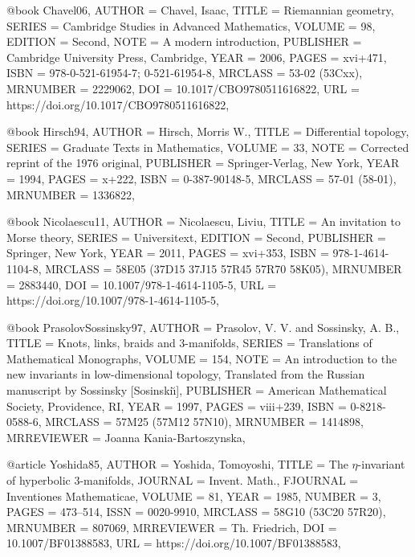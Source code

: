 @book {Chavel06,
    AUTHOR = {Chavel, Isaac},
     TITLE = {Riemannian geometry},
    SERIES = {Cambridge Studies in Advanced Mathematics},
    VOLUME = {98},
   EDITION = {Second},
      NOTE = {A modern introduction},
 PUBLISHER = {Cambridge University Press, Cambridge},
      YEAR = {2006},
     PAGES = {xvi+471},
      ISBN = {978-0-521-61954-7; 0-521-61954-8},
   MRCLASS = {53-02 (53Cxx)},
  MRNUMBER = {2229062},
       DOI = {10.1017/CBO9780511616822},
       URL = {https://doi.org/10.1017/CBO9780511616822},
}

@book {Hirsch94,
    AUTHOR = {Hirsch, Morris W.},
     TITLE = {Differential topology},
    SERIES = {Graduate Texts in Mathematics},
    VOLUME = {33},
      NOTE = {Corrected reprint of the 1976 original},
 PUBLISHER = {Springer-Verlag, New York},
      YEAR = {1994},
     PAGES = {x+222},
      ISBN = {0-387-90148-5},
   MRCLASS = {57-01 (58-01)},
  MRNUMBER = {1336822},
}

@book {Nicolaescu11,
    AUTHOR = {Nicolaescu, Liviu},
     TITLE = {An invitation to {M}orse theory},
    SERIES = {Universitext},
   EDITION = {Second},
 PUBLISHER = {Springer, New York},
      YEAR = {2011},
     PAGES = {xvi+353},
      ISBN = {978-1-4614-1104-8},
   MRCLASS = {58E05 (37D15 37J15 57R45 57R70 58K05)},
  MRNUMBER = {2883440},
       DOI = {10.1007/978-1-4614-1105-5},
       URL = {https://doi.org/10.1007/978-1-4614-1105-5},
}

@book {PrasolovSossinsky97,
    AUTHOR = {Prasolov, V. V. and Sossinsky, A. B.},
     TITLE = {Knots, links, braids and 3-manifolds},
    SERIES = {Translations of Mathematical Monographs},
    VOLUME = {154},
      NOTE = {An introduction to the new invariants in low-dimensional
              topology,
              Translated from the Russian manuscript by Sossinsky
              [Sosinski\u{\i}]},
 PUBLISHER = {American Mathematical Society, Providence, RI},
      YEAR = {1997},
     PAGES = {viii+239},
      ISBN = {0-8218-0588-6},
   MRCLASS = {57M25 (57M12 57N10)},
  MRNUMBER = {1414898},
MRREVIEWER = {Joanna Kania-Bartoszynska},
}

@article {Yoshida85,
    AUTHOR = {Yoshida, Tomoyoshi},
     TITLE = {The {$\eta$}-invariant of hyperbolic {$3$}-manifolds},
   JOURNAL = {Invent. Math.},
  FJOURNAL = {Inventiones Mathematicae},
    VOLUME = {81},
      YEAR = {1985},
    NUMBER = {3},
     PAGES = {473--514},
      ISSN = {0020-9910},
   MRCLASS = {58G10 (53C20 57R20)},
  MRNUMBER = {807069},
MRREVIEWER = {Th. Friedrich},
       DOI = {10.1007/BF01388583},
       URL = {https://doi.org/10.1007/BF01388583},
}

